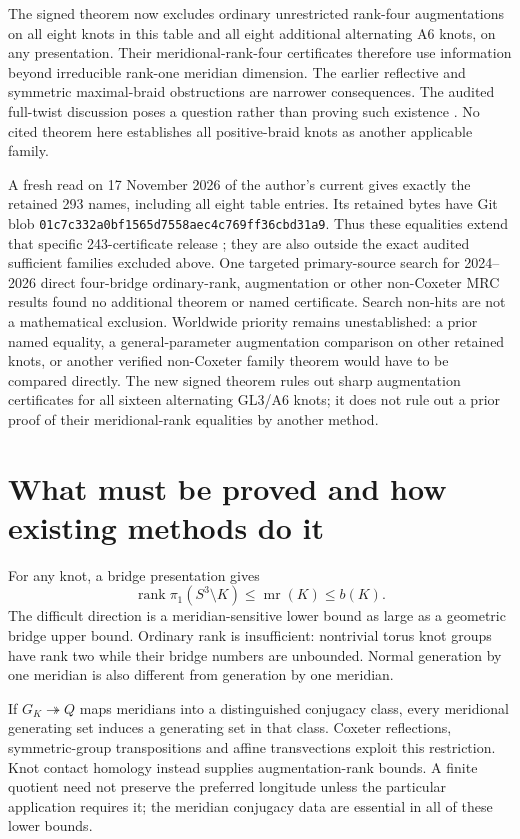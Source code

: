 \documentclass[11pt]{article}
\newcommand{\mr}{\operatorname{mr}}
\begin{document}
The signed theorem now excludes ordinary unrestricted rank-four
augmentations on all eight knots in this table and all eight additional
alternating A6 knots, on any presentation. Their meridional-rank-four
certificates therefore use information beyond irreducible rank-one
meridian dimension. The earlier reflective and symmetric maximal-braid
obstructions are narrower consequences. The audited full-twist
discussion poses a question rather than proving such existence
\cite{ch}. No cited theorem here establishes all positive-braid knots
as another applicable family.

A fresh read on 17 November 2026 of the author's current
 gives exactly the retained 293 names,
including all eight table entries. Its retained bytes have Git blob
\texttt{01c7c332a0bf1565d7558aec4c769ff36cbd31a9}.
Thus these equalities extend that specific 243-certificate release
\cite{deposit}; they are also outside the exact audited sufficient
families excluded above. One targeted primary-source search for
2024--2026 direct four-bridge ordinary-rank, augmentation or other
non-Coxeter MRC results found no additional theorem or named
certificate. Search non-hits are not a mathematical exclusion.
Worldwide priority remains unestablished: a prior named equality,
a general-parameter augmentation comparison on other retained knots, or
another verified non-Coxeter family theorem would have to be compared
directly. The new signed theorem rules out sharp augmentation
certificates for all sixteen alternating GL3/A6 knots; it does not
rule out a prior proof of their meridional-rank equalities by another
method.

\section{What must be proved and how existing methods do it}

For any knot, a bridge presentation gives
\[
 \operatorname{rank}\pi_1(S^3\setminus K)\le\mr(K)\le b(K).
\]
The difficult direction is a meridian-sensitive lower bound as large as
a geometric bridge upper bound. Ordinary rank is insufficient: nontrivial
torus knot groups have rank two while their bridge numbers are unbounded.
Normal generation by one meridian is also different from generation by
one meridian.

If $G_K\twoheadrightarrow Q$ maps meridians into a distinguished conjugacy
class, every meridional generating set induces a generating set in that
class. Coxeter reflections, symmetric-group transpositions and affine
transvections exploit this restriction. Knot contact homology instead
supplies augmentation-rank bounds. A finite quotient need not preserve the
preferred longitude unless the particular application requires it; the
meridian conjugacy data are essential in all of these lower bounds.
\end{document}
